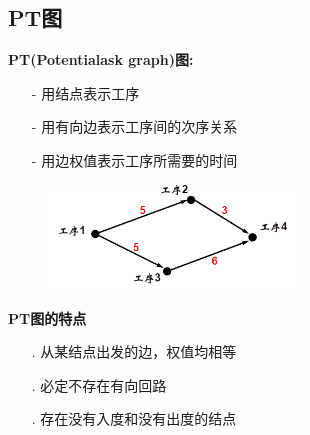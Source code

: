 \documentclass[11pt,a4paper,openany]{book}
\begin{document}
\subsection{PT图}
\textbf{PT(Potentialask graph)图:}\\
\begin{itemize}
  \item[-] 用结点表示工序
  \item[-] 用有向边表示工序间的次序关系
  \item[-] 用边权值表示工序所需要的时间
\end{itemize}
\begin{figure}[H]
  \centering
  \includegraphics[width=0.6\textwidth]{pt.png}\\
  \caption*{}
\end{figure}
\textbf{PT图的特点}\\
\begin{itemize}
  \item[.] 从某结点出发的边，权值均相等
  \item[.] 必定不存在有向回路
  \item[.] 存在没有入度和没有出度的结点
\end{itemize}
\end{document}
